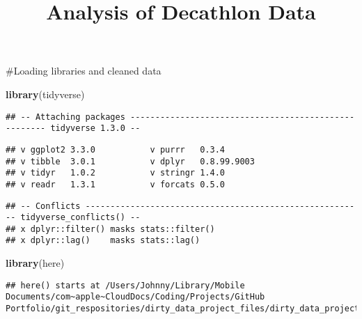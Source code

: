 \documentclass[]{article}
\title{Analysis of Decathlon Data}
\author{}
\date{\vspace{-2.5em}}
\newenvironment{Shaded}{\begin{snugshade}}{\end{snugshade}}
\newcommand{\KeywordTok}[1]{\textcolor[rgb]{0.13,0.29,0.53}{\textbf{#1}}}
\newcommand{\NormalTok}[1]{#1}
\newcommand{\OperatorTok}[1]{\textcolor[rgb]{0.81,0.36,0.00}{\textbf{#1}}}
\newcommand{\StringTok}[1]{\textcolor[rgb]{0.31,0.60,0.02}{#1}}
\begin{document}
\maketitle

\#Loading libraries and cleaned data

\begin{Shaded}
\begin{Highlighting}[]
\KeywordTok{library}\NormalTok{(tidyverse)}
\end{Highlighting}
\end{Shaded}

\begin{verbatim}
## -- Attaching packages ----------------------------------------------------- tidyverse 1.3.0 --
\end{verbatim}

\begin{verbatim}
## v ggplot2 3.3.0           v purrr   0.3.4      
## v tibble  3.0.1           v dplyr   0.8.99.9003
## v tidyr   1.0.2           v stringr 1.4.0      
## v readr   1.3.1           v forcats 0.5.0
\end{verbatim}

\begin{verbatim}
## -- Conflicts -------------------------------------------------------- tidyverse_conflicts() --
## x dplyr::filter() masks stats::filter()
## x dplyr::lag()    masks stats::lag()
\end{verbatim}

\begin{Shaded}
\begin{Highlighting}[]
\KeywordTok{library}\NormalTok{(here)}
\end{Highlighting}
\end{Shaded}

\begin{verbatim}
## here() starts at /Users/Johnny/Library/Mobile Documents/com~apple~CloudDocs/Coding/Projects/GitHub Portfolio/git_respositories/dirty_data_project_files/dirty_data_project/task1
\end{verbatim}

\begin{Shaded}
\end{Shaded}
\end{document}
